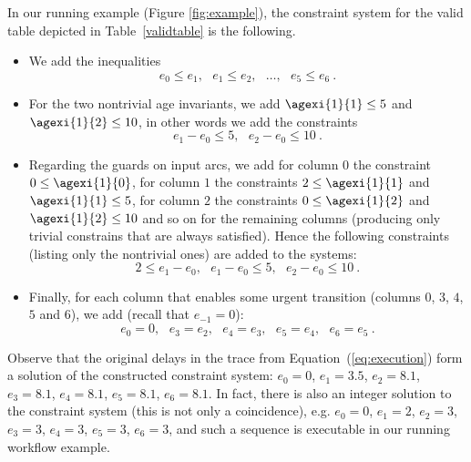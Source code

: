 In our running example (Figure \ref{fig:example}), the constraint system for the valid table
depicted in Table~\ref{validtable} is the following.
\begin{itemize}
\item We add the inequalities
$$e_0 \leq e_1,\ \ \  e_1 \leq e_2,\ \ \ \ldots,\ \ \ e_5 \leq e_6\ .$$
\item For the two nontrivial age invariants, we add
$\agexi{1}{1} \leq 5$ and $\agexi{1}{2} \leq 10$, in other words
we add the constraints
$$e_1-e_0 \leq 5,\ \ \  e_2-e_0 \leq 10 \ . $$
\item Regarding the guards on input arcs, we add for column $0$
the constraint $0 \leq\agexi{1}{0}$, for column $1$ the constraints
$2 \leq \agexi{1}{1}$ and
$\agexi{1}{1} \leq 5$, for column $2$ the constraints
$0 \leq \agexi{1}{2}$ and
$\agexi{1}{2} \leq 10$ and so on for the remaining columns (producing
only trivial constrains that are always satisfied). Hence the following
constraints (listing only the nontrivial ones) are added to the systems:
$$2 \leq e_1 - e_0,\ \ \ e_1 - e_0 \leq 5,\ \ \ e_2-e_0 \leq 10\ .$$
\item Finally, for each column that enables some urgent transition 
(columns $0$, $3$, $4$, $5$ and $6$), we add (recall that $e_{-1}=0$):
$$e_0=0, \ \ \ e_3=e_2, \ \ \ e_4=e_3, \ \ \ e_5=e_4, \ \ \ e_6=e_5\ .$$
\end{itemize}

Observe that the original delays in the trace from Equation~(\ref{eq:execution})
form a solution of the constructed constraint system: 
$e_0=0$,
$e_1=3.5$,
$e_2=8.1$,
$e_3=8.1$,
$e_4=8.1$,
$e_5=8.1$,
$e_6=8.1$.
In fact, there is also an integer solution to the constraint system
(this is not only a coincidence),
e.g.
$e_0=0$,
$e_1=2$,
$e_2=3$,
$e_3=3$,
$e_4=3$,
$e_5=3$,
$e_6=3$,
and such a sequence is executable in our running workflow example.

